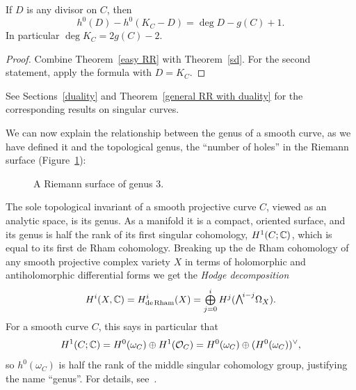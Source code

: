 \begin{theorem}\label{RR theorem}
If $D$ is any divisor on $C$, then 
$$
h^0(D) - h^0(K_C -D) = \deg D - g(C) +1.
$$
In particular $\deg K_C = 2g(C) -2$.
\unif
\end{theorem}

\begin{proof}
Combine Theorem~\ref{easy RR} with Theorem~\ref{sd}. For the second statement,
apply the formula with $D = K_C$.
\end{proof}

See Sections~\ref{duality} and Theorem~\ref{general RR with duality} for the corresponding results on singular curves.

We can now explain the relationship between the genus of a smooth curve, as we have defined it and the 
topological genus, the ``number of holes'' in the Riemann surface (Figure~\ref{RiemannSurface}):


\begin{figure}   %
\vskip-20pt
\vskip-15pt
\caption{A Riemann surface of genus 3.
}
\label{RiemannSurface}
\end{figure}


\begin{fact}
The sole topological invariant of a smooth projective curve $C$,
viewed as an analytic space, is its genus. As a manifold it is a
compact, oriented surface, and its genus is half the rank of its first
singular cohomology, $H^{1}(C; {\mathbb C})$, which is equal to its first 
de Rham 
cohomology.
Breaking up the de Rham cohomology of any smooth projective complex variety $X$ in terms of holomorphic and antiholomorphic differential
forms we get the \emph{Hodge decomposition}
$$
H^i(X,\CC) = H^i_{\mathrm{de\,Rham}}(X) = 
\tsty\bigoplus\limits_{j=0}^i H^j(\mwedge^{i-j} \Omega_X).
$$
For a smooth curve $C$, this says in  particular that
$$
H^1(C; {\mathbb C}) = H^0(\omega_C)\oplus H^1({\mathcal O}_C) = H^0(\omega_C)\oplus (H^0(\omega_C))^\vee, 
$$
so $ h^0(\omega_C)$ is half the rank of the middle singular cohomology
group, justifying the name ``genus''. For details, 
see~\cite[p.\,116]{Griffiths-Harris1978}.
\end{fact}

